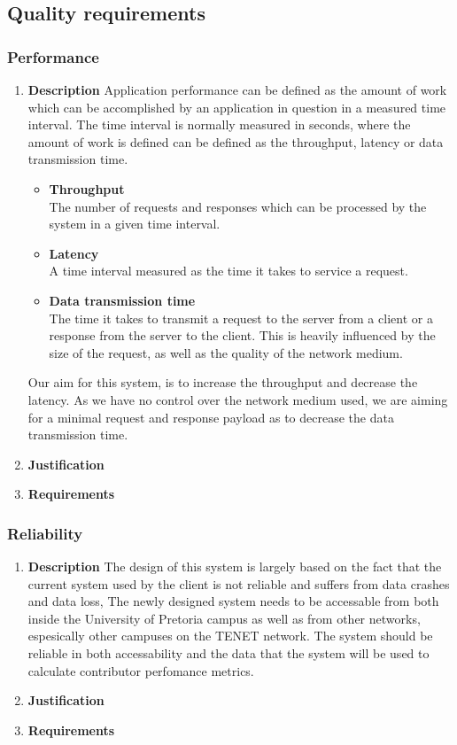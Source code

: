 \documentclass[a4paper,10pt]{article}
\begin{document}
\subsection{Quality requirements}
\subsubsection{Performance}
\begin{enumerate}
\item \textbf{Description}
Application performance can be defined as the amount of work which can be accomplished by an application in question in a measured time interval. The time interval is normally measured in seconds, where the amount of work is defined can be defined as the throughput, latency or data transmission time.
	\begin{itemize}
		\item \textbf{Throughput} \\
		The number of requests and responses which can be processed by the system in a given time interval.
		\item \textbf{Latency} \\
		A time interval measured as the time it takes to service a request. 
		\item \textbf{Data transmission time} \\
		The time it takes to transmit a request to the server from a client or a response from the server to the client. This is heavily influenced by the size of the request, as well as the quality of the network medium.
	\end{itemize}
	
	Our aim for this system, is to increase the throughput and decrease the latency. As we have no control over the network medium used, we are aiming for a minimal request and response payload as to decrease the data transmission time.
\item \textbf{Justification}
\item \textbf{Requirements}
\end{enumerate}

\subsubsection{Reliability}
\begin{enumerate}
\item \textbf{Description}
The design of this system is largely based on the fact that the current system used by the client is not reliable and suffers from data crashes and data loss, The newly designed system needs to be accessable from both inside the University of Pretoria campus as well as from other networks, espesically other campuses on the TENET network. The system should be reliable in both accessability and the data that the system will be used to calculate contributor perfomance metrics. 
\item \textbf{Justification}
\item \textbf{Requirements}
\end{enumerate}
\end{document}
